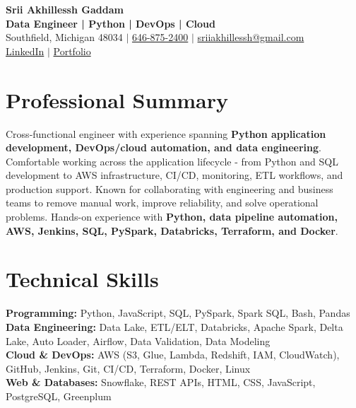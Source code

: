 \documentclass[letterpaper,10pt]{article}
\begin{document}
\fontsize{9.35pt}{10.45pt}\selectfont

\begin{center}
    {\LARGE \textbf{Srii Akhillessh Gaddam}} \\[-1pt]
    \textbf{Data Engineer | Python | DevOps | Cloud} \\[2pt]
    Southfield, Michigan 48034 $|$
    \href{tel:6468752400}{646-875-2400} $|$
    \href{mailto:sriiakhillessh@gmail.com}{sriiakhillessh@gmail.com} \\[1pt]
    \href{https://www.linkedin.com/in/srii-akhiilessh-gaddam-b48668191/}{LinkedIn} $|$
    \href{https://sriiakhillesshg.github.io/portfolio/}{Portfolio}
\end{center}
\vspace{-8pt}

\section{Professional Summary}
\small{Cross-functional engineer with experience spanning \textbf{Python application development, DevOps/cloud automation, and data engineering}. Comfortable working across the application lifecycle - from Python and SQL development to AWS infrastructure, CI/CD, monitoring, ETL workflows, and production support. Known for collaborating with engineering and business teams to remove manual work, improve reliability, and solve operational problems. Hands-on experience with \textbf{Python, data pipeline automation, AWS, Jenkins, SQL, PySpark, Databricks, Terraform, and Docker}.}

\section{Technical Skills}
\small{
\textbf{Programming:} Python, JavaScript, SQL, PySpark, Spark SQL, Bash, Pandas \\
\textbf{Data Engineering:} Data Lake, ETL/ELT, Databricks, Apache Spark, Delta Lake, Auto Loader, Airflow, Data Validation, Data Modeling \\
\textbf{Cloud \& DevOps:} AWS (S3, Glue, Lambda, Redshift, IAM, CloudWatch), GitHub, Jenkins, Git, CI/CD, Terraform, Docker, Linux \\
\textbf{Web \& Databases:} Snowflake, REST APIs, HTML, CSS, JavaScript, PostgreSQL, Greenplum
}
\end{document}
